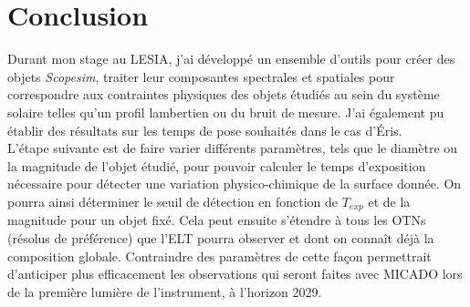 \documentclass[11pt]{aa}
\begin{document}
\section{Conclusion}
\vspace{-0.5em}
Durant mon stage au LESIA, j'ai développé un ensemble d'outils pour créer des objets \textit{Scopesim}, traiter leur composantes spectrales et spatiales pour correspondre aux contraintes physiques des objets étudiés au sein du système solaire telles qu'un profil lambertien ou du bruit de mesure. J'ai également pu établir des résultats sur les temps de pose souhaités dans le cas d'Éris.\\
L'étape suivante est de faire varier différents paramètres, tels que le diamètre ou la magnitude de l'objet étudié, pour pouvoir calculer le temps d'exposition nécessaire pour détecter une variation physico-chimique de la surface donnée. On pourra ainsi déterminer le seuil de détection en fonction de $T_{exp}$ et de la magnitude pour un objet fixé. Cela peut ensuite s'étendre à tous les OTNs (résolus de préférence) que l'ELT pourra observer et dont on connaît déjà la composition globale. Contraindre des paramètres de cette façon permettrait d'anticiper plus efficacement les observations qui seront faites avec MICADO lors de la première lumière de l'instrument, à l'horizon 2029.
\end{document}
